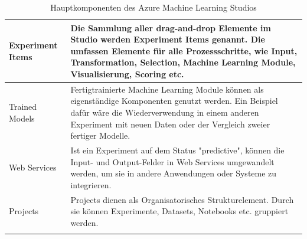 \begin{longtable}[H]{|p{}|p{14cm}|}
\hline
Experiment Items & Die Sammlung aller drag-and-drop Elemente im Studio werden Experiment Items genannt. Die umfassen Elemente für alle Prozessschritte, wie Input, Transformation, Selection, Machine Learning Module, Visualisierung, Scoring etc.\\
\hline
Trained Models & Fertigtrainierte Machine Learning Module können als eigenständige Komponenten genutzt werden. Ein Beispiel dafür wäre die Wiederverwendung in einem anderen Experiment mit neuen Daten oder der Vergleich zweier fertiger Modelle.\\
\hline
Web Services & Ist ein Experiment auf dem Status "predictive", können die Input- und Output-Felder in Web Services umgewandelt werden, um sie in andere Anwendungen oder Systeme zu integrieren.\\
\hline
Projects & Projects dienen als Organisatorisches Strukturelement. Durch sie können Experimente, Datasets, Notebooks etc. gruppiert werden. \\
\hline
\caption{Hauptkomponenten des Azure Machine Learning Studios}
\label{tab:azuremlcomponents}
\end{longtable}

